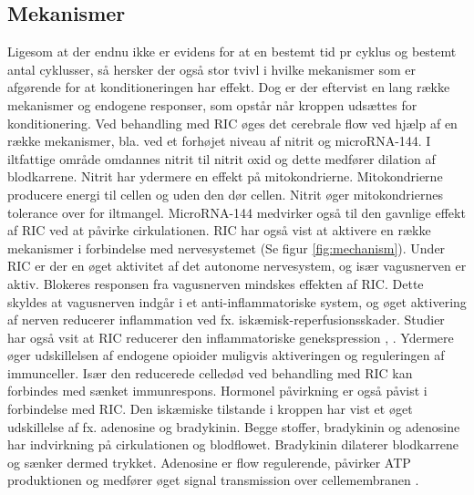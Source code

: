 \subsection{Mekanismer}
Ligesom at der endnu ikke er evidens for at en bestemt tid pr cyklus og bestemt antal cyklusser, så hersker der også stor tvivl i hvilke mekanismer som er afgørende for at konditioneringen har effekt.  Dog er der eftervist en lang række mekanismer og endogene responser, som opstår når kroppen udsættes for konditionering. Ved behandling med RIC øges det cerebrale flow ved hjælp af en række mekanismer, bla. ved et forhøjet niveau af nitrit og microRNA-144. I iltfattige område omdannes nitrit til nitrit oxid og dette medfører dilation af blodkarrene. Nitrit har ydermere en effekt på mitokondrierne. Mitokondrierne producere energi til cellen og uden den dør cellen. Nitrit øger mitokondriernes tolerance over for iltmangel. MicroRNA-144 medvirker også til den gavnlige effekt af RIC ved at påvirke cirkulationen.
RIC har også vist at aktivere en række mekanismer i forbindelse med nervesystemet (Se figur \ref{fig:mechanism}). Under RIC er der en øget aktivitet af det autonome nervesystem, og især vagusnerven er aktiv. Blokeres responsen fra vagusnerven mindskes effekten af RIC. Dette skyldes at vagusnerven indgår i et anti-inflammatoriske system, og øget aktivering af nerven reducerer inflammation ved fx. iskæmisk-reperfusionsskader. Studier har også vsit at RIC reducerer den inflammatoriske genekspression \cite{RefWorks:20}, \cite{RefWorks:3}. Ydermere  øger udskillelsen af endogene opioider muligvis aktiveringen og reguleringen af immunceller. Især den reducerede celledød ved behandling med RIC kan forbindes med sænket immunrespons. Hormonel påvirkning er også påvist i forbindelse med RIC. Den iskæmiske tilstande i kroppen har vist et øget udskillelse af fx. adenosine og bradykinin. Begge stoffer, bradykinin og adenosine har indvirkning på cirkulationen og blodflowet. Bradykinin dilaterer blodkarrene og sænker dermed trykket. Adenosine er flow regulerende, påvirker ATP produktionen og medfører øget signal transmission over cellemembranen \cite{RefWorks:3}.

